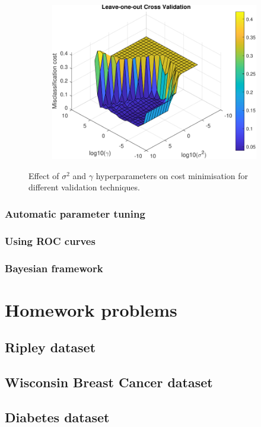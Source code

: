 \documentclass{article}
\begin{document}
\begin{figure}[h]
\begin{subfigure}[b]{0.5\textwidth}
                 \label{fig:10_fold_validation}
             \end{subfigure}
             \hfill
             \begin{subfigure}[b]{0.5\textwidth}
                 \centering
                 \includegraphics[width=\textwidth]{Assignment 1/figures/loo_cross_validation_surf.pdf}
                 \label{fig:loo_validation}
             \end{subfigure}
            \caption{Effect of $\sigma^2$ and $\gamma$ hyperparameters on cost minimisation for different validation techniques. }
        \end{figure}
            
            
        \subsubsection{Automatic parameter tuning}
    
        \subsubsection{Using ROC curves}
        
        \subsubsection{Bayesian framework} 
            
        
\section{Homework problems}
    \subsection{Ripley dataset} 
    
    \subsection{Wisconsin Breast Cancer dataset}
    
    \subsection{Diabetes dataset}
        
\end{document}
